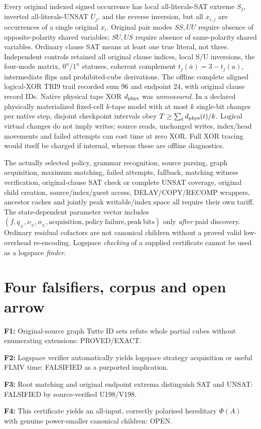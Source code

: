 \documentclass[10pt]{article}
\begin{document}
Every original indexed signed occurrence has local all-literals-SAT extreme $S_j$, inverted all-literals-UNSAT $U_j$, and the reverse inversion, but all $x_{i,j}$ are occurrences of a single original $x_i$. Original pair modes $SS,UU$ require absence of opposite-polarity shared variables; $SU,US$ require absence of same-polarity shared variables. Ordinary clause SAT means at least one true literal, not three. Independent controls retained all original clause indices, local S/U inversions, the four-mode matrix, $0^n/1^n$ statuses, coherent complement $t_j(\bar a)=3-t_j(a)$, intermediate flips and prohibited-cube derivations. The offline complete aligned logical-XOR TRI9 trail recorded sum 96 and endpoint 24, with original clause record IDs. Native physical tape XOR $d_{\rm phys}$ was \emph{unmeasured}. In a declared physically materialized fixed-cell $k$-tape model with at most $k$ single-bit changes per native step, disjoint checkpoint intervals obey $T\ge\sum_t d_{\rm phys}(t)/k$. Logical virtual changes do not imply writes; source reads, unchanged writes, index/head movements and failed attempts can cost time at zero XOR. Full XOR tracing would itself be charged if internal, whereas these are offline diagnostics.

The actually selected policy, grammar recognition, source parsing, graph acquisition, maximum matching, failed attempts, fallback, matching witness verification, original-clause SAT check or complete UNSAT coverage, original child creation, source/index/guest access, DELAY/COPY/RECOMP wrappers, ancestor caches and jointly peak writable/index space all require their own tariff. The state-dependent parameter vector includes $(f,q_\pm,\nu_\pm,o_\pm,\mathrm{acquisition},\mathrm{policy\ failure},\mathrm{peak\ bits})$ only \emph{after} paid discovery. Ordinary residual cofactors are not canonical children without a proved valid low-overhead re-encoding. Logspace \emph{checking} of a supplied certificate cannot be used as a logspace \emph{finder}.

\section{Four falsifiers, corpus and open arrow}
\noindent\textbf{F1:} Original-source graph Tutte ID sets refute whole partial cubes without enumerating extensions: PROVED/EXACT.
\par\noindent\textbf{F2:} Logspace verifier automatically yields logspace strategy acquisition or useful FLMV time: FALSIFIED as a purported implication.
\par\noindent\textbf{F3:} Root matching and original endpoint extrema distinguish SAT and UNSAT: FALSIFIED by source-verified U198/V198.
\par\noindent\textbf{F4:} This certificate yields an all-input, correctly polarised hereditary $\Phi(A)$ with genuine power-smaller canonical children: OPEN.
\end{document}
